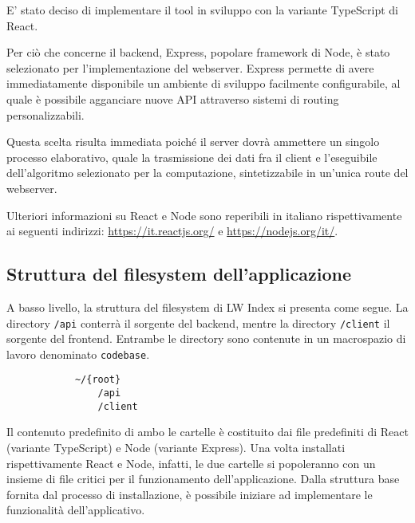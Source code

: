         E' stato deciso di implementare il tool in sviluppo con la variante TypeScript di React.
        
        \vspace{3mm}
        
        Per ciò che concerne il backend, Express, popolare framework di Node, è stato selezionato per l'implementazione del webserver. Express permette di avere immediatamente disponibile un ambiente di sviluppo facilmente configurabile, al quale è possibile agganciare nuove API attraverso sistemi di routing personalizzabili. 
        
        Questa scelta risulta immediata poiché il server dovrà ammettere un singolo processo elaborativo, quale la trasmissione dei dati fra il client e l'eseguibile dell'algoritmo selezionato per la computazione, sintetizzabile in un'unica route del webserver. 
        
        \vspace{3mm}
        
        Ulteriori informazioni su React e Node sono reperibili in italiano rispettivamente ai seguenti indirizzi: \url{https://it.reactjs.org/} e \url{https://nodejs.org/it/}.
    
    \subsection{Struttura del filesystem dell'applicazione}
    
        A basso livello, la struttura del filesystem di LW Index si presenta come segue. La directory \verb|/api| conterrà il sorgente del backend, mentre la directory \verb|/client| il sorgente del frontend. Entrambe le directory sono contenute in un macrospazio di lavoro denominato \verb|codebase|.
    
        \begin{verbatim} 
            ~/{root}         
                /api
                /client
        \end{verbatim}
        
        Il contenuto predefinito di ambo le cartelle è costituito dai file predefiniti di React (variante TypeScript) e Node (variante Express). Una volta installati rispettivamente React e Node, infatti, le due cartelle si popoleranno con un insieme di file critici per il funzionamento dell'applicazione. Dalla struttura base fornita dal processo di installazione, è possibile iniziare ad implementare le funzionalità dell'applicativo.
        
